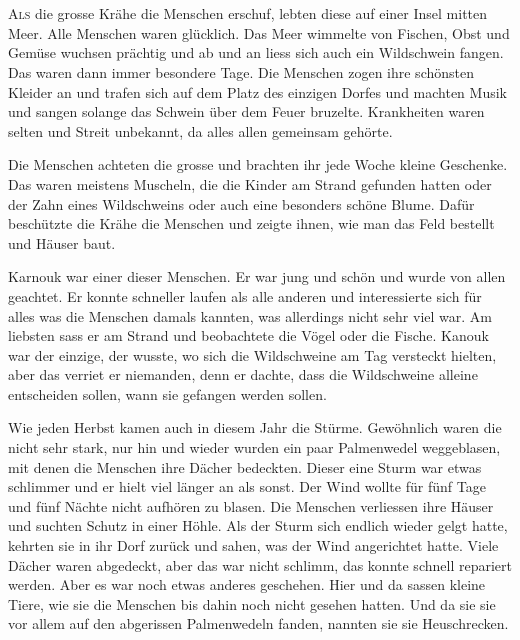 \chapter*{\FontH{\Huge }}
\lettrine[lines=2]{\color{red}A}{ls} die grosse Krähe die Menschen erschuf, lebten diese auf einer Insel mitten Meer. Alle Menschen waren glücklich. Das Meer wimmelte von Fischen, Obst und Gemüse wuchsen prächtig und ab und an liess sich auch ein Wildschwein fangen. Das waren dann immer besondere Tage. Die Menschen zogen ihre schönsten Kleider an und trafen sich auf dem Platz des einzigen Dorfes und machten Musik und sangen solange das Schwein über dem Feuer bruzelte. Krankheiten waren selten und Streit unbekannt, da alles allen gemeinsam gehörte.

Die Menschen achteten die grosse und brachten ihr jede Woche kleine Geschenke. Das waren meistens Muscheln, die die Kinder am Strand gefunden hatten oder der Zahn eines Wildschweins oder auch eine besonders schöne Blume. Dafür beschützte die Krähe die Menschen und zeigte ihnen, wie man das Feld bestellt und Häuser baut.

Karnouk war einer dieser Menschen. Er war jung und schön und wurde von allen geachtet. Er konnte schneller laufen als alle anderen und interessierte sich für alles was die Menschen damals kannten, was allerdings nicht sehr viel war. Am liebsten sass er am Strand und beobachtete die Vögel oder die Fische. Kanouk war der einzige, der wusste, wo sich die Wildschweine am Tag versteckt hielten, aber das verriet er niemanden, denn er dachte, dass die Wildschweine alleine entscheiden sollen, wann sie gefangen werden sollen.

Wie jeden Herbst kamen auch in diesem Jahr die Stürme. Gewöhnlich waren die nicht sehr stark, nur hin und wieder wurden ein paar Palmenwedel weggeblasen, mit denen die Menschen ihre Dächer bedeckten. Dieser eine Sturm war etwas schlimmer und er hielt viel länger an als sonst. Der Wind wollte für fünf Tage und fünf Nächte nicht aufhören zu blasen. Die Menschen verliessen ihre Häuser und suchten Schutz in einer Höhle. Als der Sturm sich endlich wieder gelgt hatte, kehrten sie in ihr Dorf zurück und sahen, was der Wind angerichtet hatte. Viele Dächer waren abgedeckt, aber das war nicht schlimm, das konnte schnell repariert werden. Aber es war noch etwas anderes geschehen. Hier und da sassen kleine Tiere, wie sie die Menschen bis dahin noch nicht gesehen hatten. Und da sie sie vor allem auf den abgerissen Palmenwedeln fanden, nannten sie sie Heuschrecken. 

